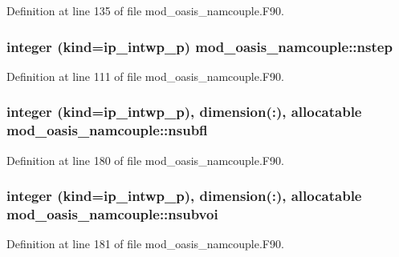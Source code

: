 Definition at line 135 of file mod\+\_\+oasis\+\_\+namcouple.\+F90.

\hypertarget{classmod__oasis__namcouple_a66c36f23a77081749dc9e7993b0277f3}{
\subsubsection[{nstep}]{\setlength{\rightskip}{0pt plus 5cm}integer (kind=ip\+\_\+intwp\+\_\+p) mod\+\_\+oasis\+\_\+namcouple\+::nstep\hspace{0.3cm}{\ttfamily [private]}}}\label{classmod__oasis__namcouple_a66c36f23a77081749dc9e7993b0277f3}


Definition at line 111 of file mod\+\_\+oasis\+\_\+namcouple.\+F90.

\hypertarget{classmod__oasis__namcouple_a6a94577996b440c31cac5b7d39e7f47a}{
\subsubsection[{nsubfl}]{\setlength{\rightskip}{0pt plus 5cm}integer (kind=ip\+\_\+intwp\+\_\+p), dimension(\+:), allocatable mod\+\_\+oasis\+\_\+namcouple\+::nsubfl\hspace{0.3cm}{\ttfamily [private]}}}\label{classmod__oasis__namcouple_a6a94577996b440c31cac5b7d39e7f47a}


Definition at line 180 of file mod\+\_\+oasis\+\_\+namcouple.\+F90.

\hypertarget{classmod__oasis__namcouple_a0f31605257bfe125aafb6488a5065d4d}{
\subsubsection[{nsubvoi}]{\setlength{\rightskip}{0pt plus 5cm}integer (kind=ip\+\_\+intwp\+\_\+p), dimension(\+:), allocatable mod\+\_\+oasis\+\_\+namcouple\+::nsubvoi\hspace{0.3cm}{\ttfamily [private]}}}\label{classmod__oasis__namcouple_a0f31605257bfe125aafb6488a5065d4d}


Definition at line 181 of file mod\+\_\+oasis\+\_\+namcouple.\+F90.

